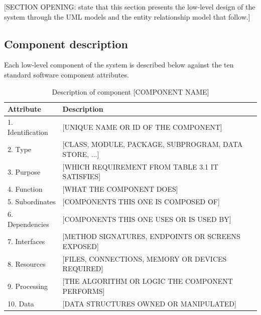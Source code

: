 [SECTION OPENING: state that this section presents the low-level design
of the system through the UML models and the entity relationship model
that follow.]

\subsection{Component description}
\label{subsec:component-description}

Each low-level component of the system is described below against the
ten standard software component attributes.

\begin{table}[H]
  \centering
  \caption{Description of component [COMPONENT NAME]}
  \label{tab:component-attributes}
  \small
  \begin{tabularx}{\textwidth}{|l|X|}
    \hline
    \textbf{Attribute} & \textbf{Description} \\
    \hline
    1. Identification & [UNIQUE NAME OR ID OF THE COMPONENT] \\
    \hline
    2. Type & [CLASS, MODULE, PACKAGE, SUBPROGRAM, DATA STORE, ...] \\
    \hline
    3. Purpose & [WHICH REQUIREMENT FROM TABLE 3.1 IT SATISFIES] \\
    \hline
    4. Function & [WHAT THE COMPONENT DOES] \\
    \hline
    5. Subordinates & [COMPONENTS THIS ONE IS COMPOSED OF] \\
    \hline
    6. Dependencies & [COMPONENTS THIS ONE USES OR IS USED BY] \\
    \hline
    7. Interfaces & [METHOD SIGNATURES, ENDPOINTS OR SCREENS EXPOSED] \\
    \hline
    8. Resources & [FILES, CONNECTIONS, MEMORY OR DEVICES REQUIRED] \\
    \hline
    9. Processing & [THE ALGORITHM OR LOGIC THE COMPONENT PERFORMS] \\
    \hline
    10. Data & [DATA STRUCTURES OWNED OR MANIPULATED] \\
    \hline
  \end{tabularx}
\end{table}

